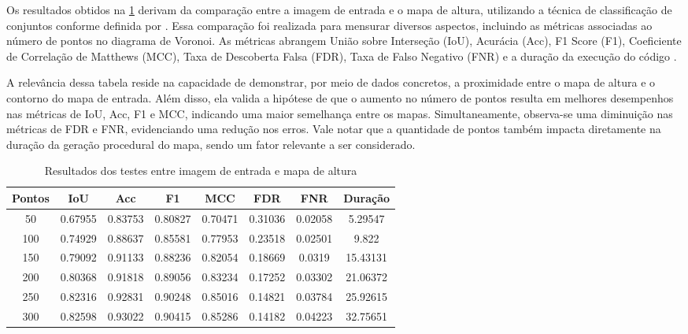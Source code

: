 Os resultados obtidos na \cref{tab:final_input_output_3d} derivam da comparação entre a imagem de entrada e o mapa de altura, utilizando a técnica de classificação de conjuntos conforme definida por \cite{kirillov2019panoptic}. Essa comparação foi realizada para mensurar diversos aspectos, incluindo as métricas associadas ao número de pontos no diagrama de Voronoi. As métricas abrangem União sobre Interseção (IoU), Acurácia (Acc), F1 Score (F1), Coeficiente de Correlação de Matthews (MCC), Taxa de Descoberta Falsa (FDR), Taxa de Falso Negativo (FNR) e a duração da execução do código \cite{Chicco2020, confusion_matrix_calculator, iou_metric_link}.

A relevância dessa tabela reside na capacidade de demonstrar, por meio de dados concretos, a proximidade entre o mapa de altura e o contorno do mapa de entrada. Além disso, ela valida a hipótese de que o aumento no número de pontos resulta em melhores desempenhos nas métricas de IoU, Acc, F1 e MCC, indicando uma maior semelhança entre os mapas. Simultaneamente, observa-se uma diminuição nas métricas de FDR e FNR, evidenciando uma redução nos erros. Vale notar que a quantidade de pontos também impacta diretamente na duração da geração procedural do mapa, sendo um fator relevante a ser considerado.


\begin{table}[h]
	\centering
	\caption{Resultados dos testes entre imagem de entrada e mapa de altura}
	\label{tab:final_input_output_3d}
	\begin{tabular}{|c|c|c|c|c|c|c|c|}
		\hline
						Pontos & IoU & Acc & F1 & MCC & FDR & FNR & Duração \\
		\hline
		50 & 0.67955 & 0.83753 & 0.80827 & 0.70471 & 0.31036 & 0.02058 & 5.29547\\
100 & 0.74929 & 0.88637 & 0.85581 & 0.77953 & 0.23518 & 0.02501 & 9.822\\
150 & 0.79092 & 0.91133 & 0.88236 & 0.82054 & 0.18669 & 0.0319 & 15.43131\\
200 & 0.80368 & 0.91818 & 0.89056 & 0.83234 & 0.17252 & 0.03302 & 21.06372\\
250 & 0.82316 & 0.92831 & 0.90248 & 0.85016 & 0.14821 & 0.03784 & 25.92615\\
300 & 0.82598 & 0.93022 & 0.90415 & 0.85286 & 0.14182 & 0.04223 & 32.75651\\
		\hline
	\end{tabular}
\end{table}

